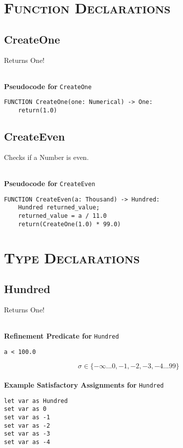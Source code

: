 
\section{\textsc{Function Declarations}}
\clearpage

\subsection{CreateOne}
Returns One!

\textbf{\\ Pseudocode for } \texttt{CreateOne}
\begin{verbatim}
FUNCTION CreateOne(one: Numerical) -> One:
	return(1.0)
\end{verbatim}

\clearpage

\subsection{CreateEven}
Checks if a Number is even.

\textbf{\\ Pseudocode for } \texttt{CreateEven}
\begin{verbatim}
FUNCTION CreateEven(a: Thousand) -> Hundred:
	Hundred returned_value;
	returned_value = a / 11.0
	return(CreateOne(1.0) * 99.0)
\end{verbatim}


\section{\textsc{Type Declarations}}

\subsection{Hundred}
Returns One!

\textbf{\\ Refinement Predicate for } \texttt{Hundred}
\begin{verbatim}
a < 100.0
\end{verbatim}

$$\sigma \in \{ -\infty ... 0, -1, -2, -3, -4 ... 99 \}$$ \ \
\textbf{\\ Example Satisfactory Assignments for } \texttt{Hundred}
\begin{verbatim}
let var as Hundred
set var as 0
set var as -1
set var as -2
set var as -3
set var as -4
\end{verbatim}


